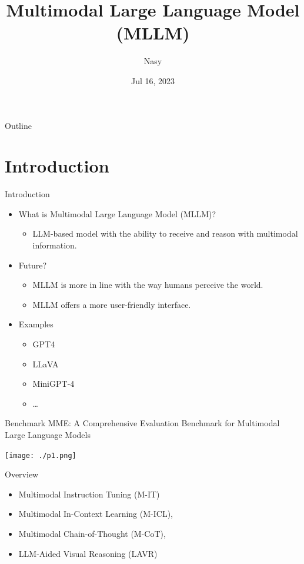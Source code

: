 \documentclass[aspectratio=1610,xcolor={dvipsnames},hyperref={colorlinks,unicode,linkcolor=violet,anchorcolor=BlueViolet,citecolor=YellowOrange,filecolor=black,urlcolor=Aquamarine}]{beamer}
\author{Nasy}
\date{Jul 16, 2023}
\title{Multimodal Large Language Model (MLLM)}
\begin{document}
\maketitle
\begin{frame}{Outline}
\setcounter{tocdepth}{1}
\tableofcontents
\end{frame}

\setcounter{tocdepth}{2}

\section{Introduction}
\label{sec:orgd4394ca}

\begin{frame}[label={sec:org8755cc1}]{Introduction}
\begin{itemize}
\item What is Multimodal Large Language Model (MLLM)?
\begin{itemize}
\item LLM-based model with the ability to receive and reason with multimodal information.
\end{itemize}
\item Future?
\begin{itemize}
\item MLLM is more in line with the way humans perceive the world.
\item MLLM offers a more user-friendly interface.
\end{itemize}
\item Examples
\begin{itemize}
\item GPT4
\item LLaVA
\item MiniGPT-4
\item \ldots{}
\end{itemize}
\end{itemize}
\end{frame}

\begin{frame}[label={sec:orga489961}]{Benchmark}
MME: A Comprehensive Evaluation Benchmark for Multimodal Large Language Models

\begin{center}
\texttt{[image: ./p1.png]}
\end{center}
\end{frame}

\begin{frame}[label={sec:orgb751986}]{Overview}
\begin{itemize}
\item \alert{Multimodal Instruction Tuning (M-IT)}
\item Multimodal In-Context Learning (M-ICL),
\item Multimodal Chain-of-Thought (M-CoT),
\item LLM-Aided Visual Reasoning (LAVR)
\end{itemize}
\end{frame}
\end{document}
